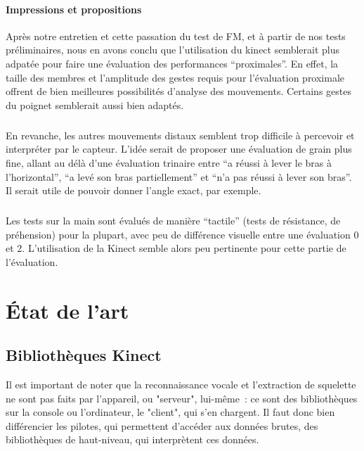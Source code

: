 \documentclass[french,12pt]{report}
\begin{document}
	\subsubsection{Impressions et propositions}
Après notre entretien et cette passation du test de FM, et à partir de nos tests préliminaires, nous en avons 
conclu que l'utilisation du kinect semblerait plus adpatée pour faire une évaluation des performances “proximales”.
En effet, la taille des membres et l'amplitude des gestes requis pour l'évaluation proximale offrent de bien 
meilleures possibilités d'analyse des mouvements. Certains gestes du poignet semblerait aussi bien adaptés.
\paragraph{}En revanche, les autres mouvements distaux semblent trop difficile à percevoir et interpréter par le capteur.
L’idée serait de proposer une évaluation de grain plus fine, allant au délà d’une évaluation trinaire entre 
“a réussi à lever le bras à l’horizontal”, “a levé son bras partiellement” et “n’a pas réussi à lever son bras”. 
Il serait utile de pouvoir donner l’angle exact, par exemple.   

\paragraph{}Les tests sur la main sont évalués de manière “tactile” (tests de résistance, de préhension) pour la plupart, 
avec peu de différence visuelle entre une évaluation 0 et 2. L’utilisation de la Kinect semble alors peu pertinente
pour cette partie de l’évaluation.
		
	\chapter{État de l'art}
	
	
  \section{Bibliothèques Kinect}
		
Il est important de noter que la reconnaissance vocale et l'extraction de 
squelette ne sont pas faits par l'appareil, ou "serveur", lui-même~: ce sont des
bibliothèques sur la console ou l'ordinateur, le "client", qui s'en chargent. 
Il faut donc bien
différencier les pilotes, qui permettent d'accéder aux données brutes, des
bibliothèques de haut-niveau, qui interprètent ces données.
\end{document}

